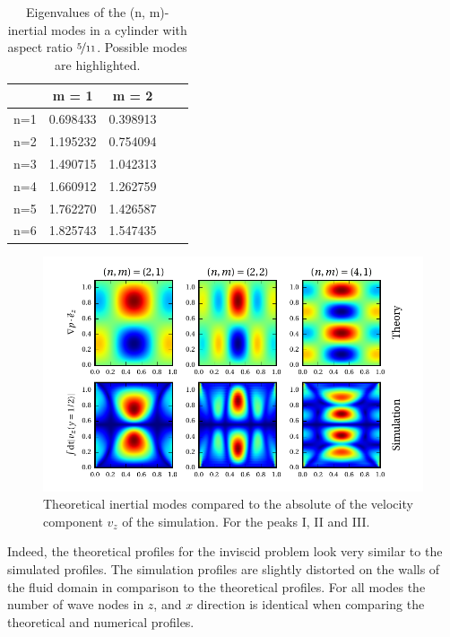 \bgroup\large
\begin{table}[!b]
\centering
\def\arraystretch{1.5}%
\begin{tabular}{c c c c c}\toprule
            &    m =  1  & m = 2   &    \\ \hline
\midrule
        n=1 &   0.698433         &              0.398913 &    \\
        n=2 & \cellcolor{blue!25}  1.195232         &        \cellcolor{blue!25}      0.754094 &    \\
        n=3 &   1.490715         &              1.042313 &    \\
        n=4 &  \cellcolor{blue!25} 1.660912         &     \cellcolor{blue!25}         1.262759 &    \\
        n=5 &   1.762270         &              1.426587 &    \\
        n=6 &   1.825743         &              1.547435 &    \\ \hline

\bottomrule
\end{tabular}
\caption{Eigenvalues of the (n, m)-inertial modes in a cylinder with aspect ratio $\nicefrac{5}{11}$.
            Possible modes are highlighted.  \label{cone_cyleigenvalues} }
\end{table}
\egroup
\clearpage


\begin{figure}[!t]
  \centering
  \includegraphics{gfx/cone/cylinder/modes.pdf}  \caption{
      Theoretical inertial modes compared to the absolute of the velocity component $v_z$ of the simulation.
      For the peaks \RN{1}, \RN{2} and \RN{3}.
      \label{cone:cyl_modes}}
\end{figure}

Indeed, the theoretical profiles for the inviscid problem look very similar to the simulated profiles.
The simulation profiles are slightly distorted on the walls of the fluid domain in
comparison to the theoretical profiles.
For all modes the number of wave nodes in $z$, and $x$ direction is identical
when comparing the theoretical and numerical profiles.

